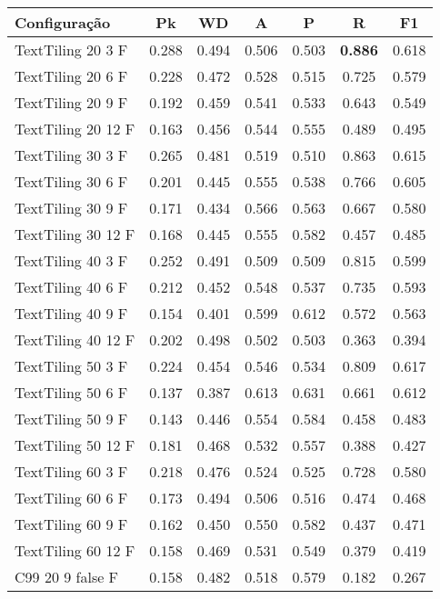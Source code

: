 \documentclass{article}
\begin{document}
 
\begin{tabular}{|l|c|c|c|c|c|c|} 
\hline 
Configuração & \textbf{Pk} & \textbf{WD} & \textbf{A } & \textbf{P } & \textbf{R } & \textbf{F1}\\ \hline
TextTiling 20  3 F & 0.288 & 0.494 & 0.506 & 0.503 & \textbf{0.886} & 0.618\\ \hline
TextTiling 20  6 F & 0.228 & 0.472 & 0.528 & 0.515 & 0.725 & 0.579\\ \hline
TextTiling 20  9 F & 0.192 & 0.459 & 0.541 & 0.533 & 0.643 & 0.549\\ \hline
TextTiling 20 12 F & 0.163 & 0.456 & 0.544 & 0.555 & 0.489 & 0.495\\ \hline
TextTiling 30  3 F & 0.265 & 0.481 & 0.519 & 0.510 & 0.863 & 0.615\\ \hline
TextTiling 30  6 F & 0.201 & 0.445 & 0.555 & 0.538 & 0.766 & 0.605\\ \hline
TextTiling 30  9 F & 0.171 & 0.434 & 0.566 & 0.563 & 0.667 & 0.580\\ \hline
TextTiling 30 12 F & 0.168 & 0.445 & 0.555 & 0.582 & 0.457 & 0.485\\ \hline
TextTiling 40  3 F & 0.252 & 0.491 & 0.509 & 0.509 & 0.815 & 0.599\\ \hline
TextTiling 40  6 F & 0.212 & 0.452 & 0.548 & 0.537 & 0.735 & 0.593\\ \hline
TextTiling 40  9 F & 0.154 & 0.401 & 0.599 & 0.612 & 0.572 & 0.563\\ \hline
TextTiling 40 12 F & 0.202 & 0.498 & 0.502 & 0.503 & 0.363 & 0.394\\ \hline
TextTiling 50  3 F & 0.224 & 0.454 & 0.546 & 0.534 & 0.809 & 0.617\\ \hline
TextTiling 50  6 F & 0.137 & 0.387 & 0.613 & 0.631 & 0.661 & 0.612\\ \hline
TextTiling 50  9 F & 0.143 & 0.446 & 0.554 & 0.584 & 0.458 & 0.483\\ \hline
TextTiling 50 12 F & 0.181 & 0.468 & 0.532 & 0.557 & 0.388 & 0.427\\ \hline
TextTiling 60  3 F & 0.218 & 0.476 & 0.524 & 0.525 & 0.728 & 0.580\\ \hline
TextTiling 60  6 F & 0.173 & 0.494 & 0.506 & 0.516 & 0.474 & 0.468\\ \hline
TextTiling 60  9 F & 0.162 & 0.450 & 0.550 & 0.582 & 0.437 & 0.471\\ \hline
TextTiling 60 12 F & 0.158 & 0.469 & 0.531 & 0.549 & 0.379 & 0.419\\ \hline
C99 20  9 false F & 0.158 & 0.482 & 0.518 & 0.579 & 0.182 & 0.267\\ \hline

\end{tabular}
\end{document}
